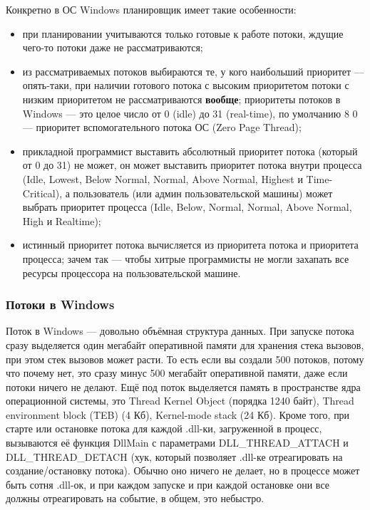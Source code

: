 \documentclass{../../text-style}
\begin{document}
Конкретно в ОС Windows планировщик имеет такие особенности:
\begin{itemize}
    \item при планировании учитываются только готовые к работе потоки, ждущие чего-то потоки даже не рассматриваются;
    \item из рассматриваемых потоков выбираются те, у кого наибольший приоритет --- опять-таки, при наличии готового потока с высоким приоритетом потоки с низким приоритетом не рассматриваются \textbf{вообще}; приоритеты потоков в Windows --- это целое число от 0 (idle) до 31 (real-time), по умолчанию 8 0 --- приоритет вспомогательного потока ОС (Zero Page Thread);
    \item прикладной программист выставить абсолютный приоритет потока (который от 0 до 31) не может, он может выставить приоритет потока внутри процесса (Idle, Lowest, Below Normal, Normal, Above Normal, Highest и Time-Critical), а пользователь (или админ пользовательской машины) может выбрать приоритет процесса (Idle, Below, Normal, Normal, Above Normal, High и Realtime);
    \item истинный приоритет потока вычисляется из приоритета потока и приоритета процесса; зачем так --- чтобы хитрые программисты не могли захапать все ресурсы процессора на пользовательской машине.
\end{itemize}

\subsubsection{Потоки в Windows}

Поток в Windows --- довольно объёмная структура данных. При запуске потока сразу выделяется один мегабайт оперативной памяти для хранения стека вызовов, при этом стек вызовов может расти. То есть если вы создали 500 потоков, потому что почему нет, это сразу минус 500 мегабайт оперативной памяти, даже если потоки ничего не делают. Ещё под поток выделяется память в пространстве ядра операционной системы, это Thread Kernel Object (порядка 1240 байт), Thread environment block (TEB) (4 Кб), Kernel-mode stack (24 Кб). Кроме того, при старте или остановке потока для каждой .dll-ки, загруженной в процесс, вызываются её функция DllMain с параметрами DLL\_THREAD\_ATTACH и DLL\_THREAD\_DETACH (хук, который позволяет .dll-ке отреагировать на создание/остановку потока). Обычно оно ничего не делает, но в процессе может быть сотня .dll-ок, и при каждом запуске и при каждой остановке они все должны отреагировать на событие, в общем, это небыстро.
\end{document}
